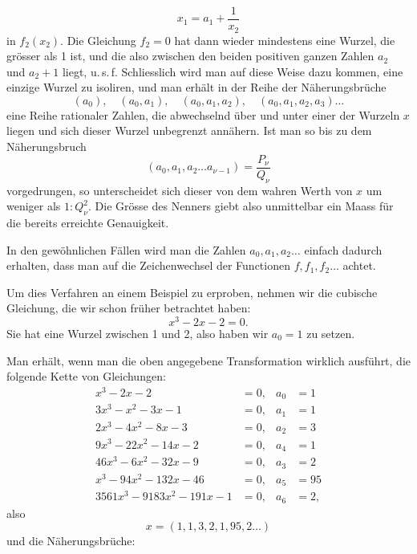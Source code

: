 \[
x_1 = a_1 + \frac{1}{x_2}
\]
in $f_2(x_2)$. Die Gleichung $f_2 = 0$ hat dann wieder mindestens
eine Wurzel, die grösser als 1 ist, und die also zwischen den
beiden positiven ganzen Zahlen $a_2$ und $a_2 + 1$ liegt, u.\,s.\,f.
Schliesslich wird man auf diese Weise dazu kommen, eine einzige
Wurzel zu isoliren, und man erhält in der Reihe der Näherungsbrüche
\[
(a_0), \quad (a_0, a_1), \quad (a_0, a_1, a_2), \quad (a_0, a_1, a_2, a_3) \ldots
\]
eine Reihe rationaler Zahlen, die abwechselnd über und unter
einer der Wurzeln $x$ liegen und sich dieser Wurzel unbegrenzt
annähern. Ist man so bis zu dem Näherungsbruch
\[
(a_0, a_1, a_2 \ldots a_{\nu-1}) = \frac{P_\nu}{Q_\nu}
\]
vorgedrungen, so unterscheidet sich dieser von dem wahren Werth
von $x$ um weniger als $1 : Q_\nu^2$. Die Grösse des Nenners giebt
also unmittelbar ein Maass für die bereits erreichte Genauigkeit.

In den gewöhnlichen Fällen wird man die Zahlen $a_0, a_1, a_2 \ldots$
einfach dadurch erhalten, dass man auf die Zeichenwechsel der
Functionen $f, f_1, f_2 \ldots$ achtet.

Um dies Verfahren an einem Beispiel zu erproben, nehmen
wir die cubische Gleichung, die wir schon früher betrachtet
haben:
\[
x^3 - 2x - 2 = 0.
\]
Sie hat eine Wurzel zwischen 1 und 2, also haben wir $a_0 = 1$
zu setzen.

Man erhält, wenn man die oben angegebene Transformation
wirklich ausführt, die folgende Kette von Gleichungen:
\[
\begin{aligned}
x^3 - 2x - 2 &= 0, & a_0 &= 1\\
3x^3 - x^2 - 3x - 1 &= 0, & a_1 &= 1\\
2x^3 - 4x^2 - 8x - 3 &= 0, & a_2 &= 3\\
9x^3 - 22x^2 - 14x - 2 &= 0, & a_4 &= 1\\ %
46x^3 - 6x^2 - 32x - 9 &= 0, & a_3 &= 2\\
x^3 - 94x^2 - 132x - 46 &= 0, & a_5 &= 95\\
3561x^3 - 9183x^2 - 191x - 1 &= 0, & a_6 &= 2,
\end{aligned}
\]
also
\[
x = (1, 1, 3, 2, 1, 95, 2 \ldots)
\]
und die Näherungsbrüche:
